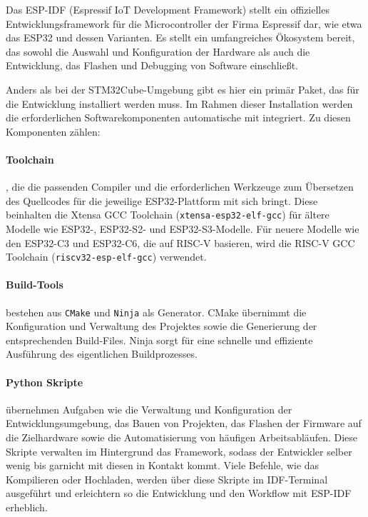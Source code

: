 
Das ESP-IDF (Espressif IoT Development Framework) stellt ein offizielles Entwicklungsframework für die Microcontroller der Firma Espressif dar, wie etwa das ESP32 und dessen Varianten. 
Es stellt ein umfangreiches Ökosystem bereit, das sowohl die Auswahl und Konfiguration der Hardware als auch die Entwicklung, das Flashen und Debugging von Software einschließt.

Anders als bei der STM32Cube-Umgebung gibt es hier ein primär Paket, das für die Entwicklung installiert werden muss.
Im Rahmen dieser Installation werden die erforderlichen Softwarekomponenten automatische mit integriert.
Zu diesen Komponenten zählen:

\paragraph{Toolchain}
, die die passenden Compiler und die erforderlichen Werkzeuge zum Übersetzen des Quellcodes für die jeweilige ESP32-Plattform mit sich bringt. 
Diese beinhalten die Xtensa GCC Toolchain (\texttt{xtensa-esp32-elf-gcc}) für ältere Modelle wie  ESP32-, ESP32-S2- und ESP32-S3-Modelle.
Für neuere Modelle wie den ESP32-C3 und ESP32-C6, die auf RISC-V basieren, wird die RISC-V GCC Toolchain (\texttt{riscv32-esp-elf-gcc}) verwendet.

\paragraph{Build-Tools} 
bestehen aus \texttt{CMake} und \texttt{Ninja} als Generator. 
CMake übernimmt die Konfiguration und Verwaltung des Projektes sowie die Generierung der entsprechenden Build-Files. 
Ninja sorgt für eine schnelle und effiziente Ausführung des eigentlichen Buildprozesses.

\paragraph{Python Skripte}
übernehmen Aufgaben wie die Verwaltung und Konfiguration der Entwicklungsumgebung, das Bauen von Projekten, das Flashen der Firmware auf die Zielhardware sowie die Automatisierung von häufigen Arbeitsabläufen. 
Diese Skripte verwalten im Hintergrund das Framework, sodass der Entwickler selber wenig bis garnicht mit diesen in Kontakt kommt.
Viele Befehle, wie das Kompilieren oder Hochladen, werden über diese Skripte im IDF-Terminal ausgeführt und erleichtern so die Entwicklung und den Workflow mit ESP-IDF erheblich.

